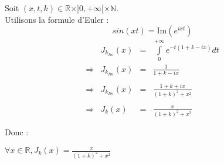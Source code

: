 Soit $(x, t, k)\in \mathbb{R}\times]0, +\infty[\times\mathbb{N}$.\\
Utilisons la formule d'Euler :
\[
  sin(xt) = \text{Im}\left(e^{ixt}\right)
\]
\[
  \begin{array}{rrcl}
                & J_{k_{Im}}(x) & = & \int\limits_{0}^{+\infty}{e^{-t(1+k-ix)}dt} \\
    \Rightarrow & J_{k_{Im}}(x) & = & \frac{1}{1+k-ix}                            \\\\
    \Rightarrow & J_{k_{Im}}(x) & = & \frac{1+k+ix}{(1+k)^2+x^2}                  \\\\
    \Rightarrow & J_k(x)        & = & \frac{x}{(1+k)^2+x^2}                       \\\\
  \end{array}
\]
Donc :
\begin{result}
  $\forall x\in\mathbb{R}, J_k(x) = \frac{x}{(1+k)^2+x^2}  $
\end{result}
